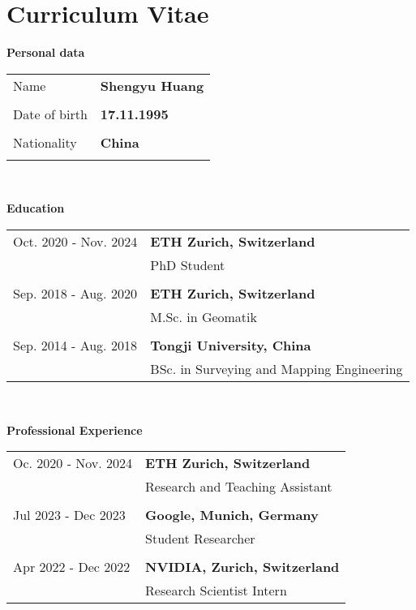 
\chapter{Curriculum Vitae}
\textbf{Personal data}\\

\begin{tabular}{ p{4cm} l }
  {Name} & {\textbf{Shengyu Huang}}\\
  {} & {}\\
  {Date of birth} & {\textbf{17.11.1995}}\\
  {} & {}\\
  {Nationality} & {\textbf{China}}\\
  {} & {}\\
\end{tabular}\\

\vspace{0.5cm}

\noindent
\textbf{Education}\\

\begin{tabular}{ p{4cm} l }
  {Oct. 2020 - Nov. 2024} & {\textbf{ETH Zurich, Switzerland}}\\
  {} & {PhD Student} \\
  {} & {}\\
  {Sep. 2018 - Aug. 2020} & {\textbf{ETH Zurich, Switzerland}}\\
  {} & {M.Sc. in Geomatik} \\
  {} & {}\\
  {Sep. 2014 - Aug. 2018} & {\textbf{Tongji University, China}}\\
  {} & {BSc. in Surveying and Mapping Engineering} \\
\end{tabular}\\

\vspace{0.5cm}

\noindent
\textbf{Professional Experience}\\

\begin{tabular}{ p{4cm} l }
  {Oc. 2020 - Nov. 2024} & {\textbf{ETH Zurich, Switzerland}}\\
  {} & {Research and Teaching Assistant} \\
  {} & {}\\
  {Jul 2023 - Dec 2023} & {\textbf{Google, Munich, Germany}}\\
  {} & {Student Researcher} \\
  {} & {}\\
  {Apr 2022 - Dec 2022} & {\textbf{NVIDIA, Zurich, Switzerland}}\\
  {} & {Research Scientist Intern} \\
\end{tabular}